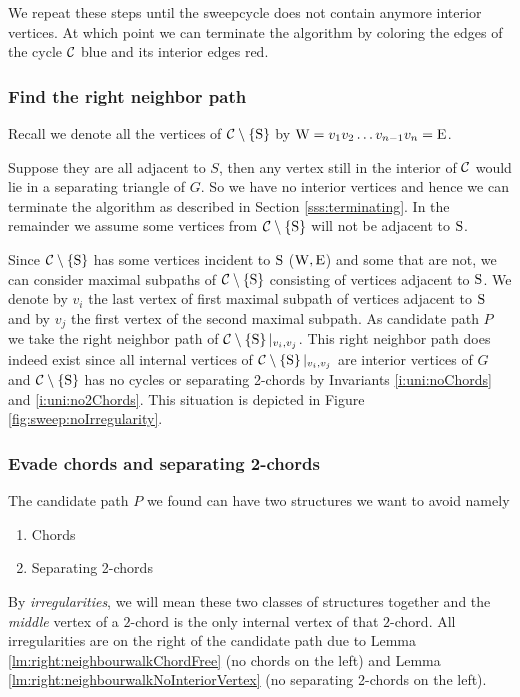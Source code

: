 We repeat these steps until the sweepcycle does not contain anymore interior vertices. At which point we can terminate the algorithm by coloring the edges of the cycle $\mathcal{C}$ blue and its interior edges red.

\subsubsection{Find the right neighbor path}
  Recall we denote all the vertices of $\mathcal{C} \setminus \left\lbrace {\mathrm{S}} \right\rbrace$ by $\mathrm{W} =  v_1   v_2   \ldots v_{n-1}   v_n = \mathrm{E}$.

  Suppose they are all adjacent to $S$, then any vertex still in the interior of $\mathcal{C}$ would lie in a separating triangle of $G$. So we have no interior vertices and hence we can terminate the algorithm as described in Section \ref{sss:terminating}.
  In the remainder we assume some vertices from $\mathcal{C} \setminus \left\lbrace {\mathrm{S}} \right\rbrace$ will not be adjacent to $\mathrm{S}$.

  Since $\mathcal{C} \setminus \left\lbrace {\mathrm{S}} \right\rbrace$ has some vertices incident to $\mathrm{S}$ ($\mathrm{W} , \mathrm{E}$) and some that are not, we can consider maximal subpaths of $\mathcal{C} \setminus \left\lbrace {\mathrm{S}} \right\rbrace$ consisting of vertices adjacent to $\mathrm{S}$.
  We denote by $v_i$ the last vertex of first maximal subpath of vertices adjacent to $\mathrm{S}$ and by $v_j$ the first vertex of the second maximal subpath.
  As candidate path $P$ we take the right neighbor path of $\mathcal{C} \setminus \left\lbrace {\mathrm{S}} \right\rbrace|_{v_i, v_j}$. This right neighbor path does indeed exist since all internal vertices of $\mathcal{C} \setminus \left\lbrace {\mathrm{S}} \right\rbrace|_{v_i, v_j}$ are interior vertices of $G$ and $\mathcal{C} \setminus \left\lbrace {\mathrm{S}} \right\rbrace$ has no cycles or separating 2-chords by Invariants \ref{i:uni:noChords} and \ref{i:uni:no2Chords}.
  This situation is depicted in Figure \ref{fig:sweep:noIrregularity}.

\subsubsection{Evade chords and separating 2-chords}
  The candidate path $P$ we found can have two structures we want to avoid
  namely
  \begin{enumerate}
    \itemsep=-4pt
    \item Chords
    \item Separating 2-chords
  \end{enumerate}

  By \emph{irregularities}, we will mean these two classes of structures together and the \emph{middle} vertex of a $2$-chord is the only internal vertex of that $2$-chord.
  All irregularities are on the right of the candidate path due to Lemma \ref{lm:right:neighbourwalkChordFree} (no chords on the left) and Lemma \ref{lm:right:neighbourwalkNoInteriorVertex} (no separating 2-chords on the left).

